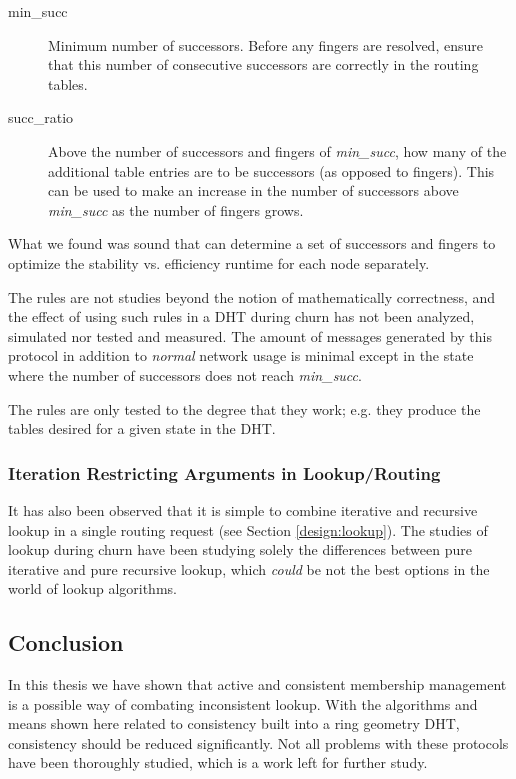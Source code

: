 \begin{description}
\item[min\_succ]
     Minimum number of successors. Before any fingers are resolved, ensure
     that this number of consecutive successors are correctly in the routing
     tables.
\item[succ\_ratio]
     Above the number of successors and fingers of \emph{min\_succ}, how many
     of the additional table entries are to be successors (as opposed to fingers).
     This can be used to make an increase in the number of successors above
     \emph{min\_succ} as the number of fingers grows.
\end{description}

What we found was sound  that can determine a set of
 successors and fingers to optimize the stability vs. efficiency runtime for each
 node separately.

The rules are not studies beyond the notion of mathematically correctness, and the
 effect of using such rules in a DHT during churn has not been analyzed, simulated
 nor tested and measured. The amount of messages generated by this protocol in
 addition to \emph{normal} network usage is minimal except in the 
 state where the number of successors does not reach \emph{min\_succ}.

The rules are only tested to the degree that they work; e.g. they produce the tables
 desired for a given state in the DHT.

\subsubsection{Iteration Restricting Arguments in Lookup/Routing}

It has also been observed that it is simple to combine iterative and recursive
 lookup in a single routing request (see Section \ref{design:lookup}).
 The studies of lookup during churn have been studying solely the differences
 between pure iterative and pure recursive lookup, which \emph{could} be not the
 best options in the world of lookup algorithms.

\subsection{Conclusion}

In this thesis we have shown that active and consistent membership management is
 a possible way of combating inconsistent lookup. With the algorithms and means shown
 here related to consistency built into a ring geometry DHT, consistency should be
 reduced significantly. Not all problems with these protocols have been thoroughly
 studied, which is a work left for further study.


